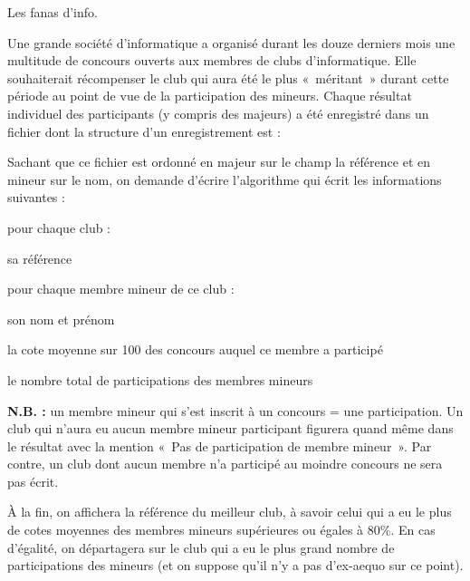 \begin{Exercice}{Les fanas d'info.}

	Une grande société d’informatique a organisé durant les douze derniers
	mois une multitude de concours ouverts aux membres de clubs
	d’informatique. Elle souhaiterait récompenser le club qui aura été le
	plus «~méritant~» durant cette période au point de vue de la
	participation des mineurs. Chaque résultat individuel des participants
	(y compris des majeurs) a été enregistré dans un fichier  dont
	la structure d’un enregistrement  est :


	Sachant que ce fichier est ordonné en majeur sur le champ la référence
	et en mineur sur le nom, on demande d’écrire l’algorithme qui écrit les
	informations suivantes :

	pour chaque club :

	\liststyleListv
	\begin{liste}
		\item 
			sa référence
		\item 
			pour chaque membre mineur de ce club :
		\item 
			son nom et prénom
		\item 
				la cote moyenne sur 100 des concours auquel ce membre a participé
		\item 
			le nombre total de participations des membres mineurs
	\end{liste}
	
	\textbf{N.B. : }un membre mineur qui s’est inscrit à un concours = une
	participation. Un club qui n’aura eu aucun membre mineur participant
	figurera quand même dans le résultat avec la mention «~Pas de
	participation de membre mineur~». Par contre, un club dont aucun membre
	n’a participé au moindre concours ne sera pas écrit.

	À la fin, on affichera la référence du meilleur club, à savoir celui qui
	a eu le plus de cotes moyennes des membres mineurs supérieures ou
	égales à 80\%. En cas d’égalité, on départagera sur le club qui a eu le
	plus grand nombre de participations des mineurs (et on suppose qu’il
	n’y a pas d’ex-aequo sur ce point). 
\end{Exercice}

